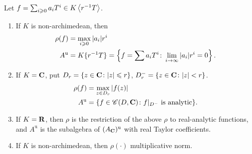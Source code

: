 \begin{theorem}\label{thm:tate-algebra}
Let $f=\sum_{i\geqslant 0} a_i T^i\in K\left\langle r^{-1} T \right\rangle$. 
\begin{enumerate}
\item
If $K$ is non-archimedean, then 
\begin{align*}
	\rho(f) &= \max_{i\geqslant 0} |a_i| r^i \\
	A^\mathrm{u} &= K\{ r^{-1} T \} = \left\{f=\sum a_i T^i\colon \lim_{i\to \infty} |a_i| r^i = 0\right\} .
\end{align*}

\item
If $K=\mathbf{C}$, put $D_r=\{z\in \mathbf{C}\colon |z|\leqslant r\}$, 
$D_r^-=\{z\in \mathbf{C}\colon |z|<r\}$. 
\begin{align*}
	\rho(f) &= \max_{z\in D_r} |f(z)| \\
	A^\mathrm{u} &= \{f\in \mathscr{C}(D,\mathbf{C})\colon f|_{D^-}\text{ is analytic}\} .
\end{align*}

\item
If $K=\mathbf{R}$, then $\rho$ is the restriction of the above $\rho$ to real-analytic 
functions, and $A^\mathrm{u}$ is the subalgebra of $(A_{\mathbf{C}})^\mathrm{u}$ with 
real Taylor coefficients. 

\item
If $K$ is non-archimedean, then $\rho(\cdot)$ multiplicative norm. 
\end{enumerate}
\end{theorem}
